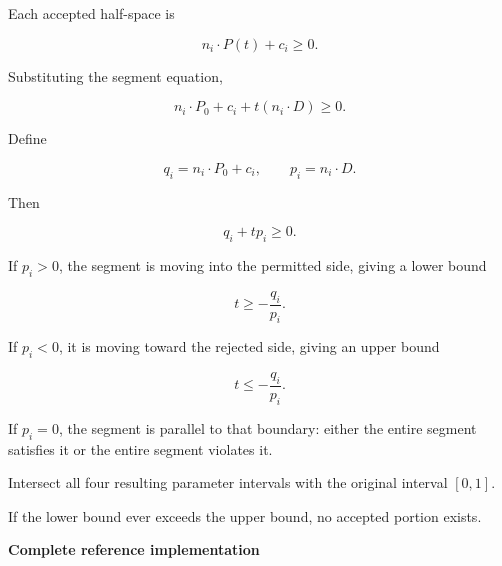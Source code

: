 Each accepted half-space is

\[
n_i\cdot P(t)+c_i\ge0.
\]

Substituting the segment equation,

\[
n_i\cdot P_0+c_i+t(n_i\cdot D)\ge0.
\]

Define

\[
q_i=n_i\cdot P_0+c_i,\qquad p_i=n_i\cdot D.
\]

Then

\[
q_i+t p_i\ge0.
\]

If \(p_i>0\), the segment is moving into the permitted side, giving a lower bound

\[
t\ge-\frac{q_i}{p_i}.
\]

If \(p_i<0\), it is moving toward the rejected side, giving an upper bound

\[
t\le-\frac{q_i}{p_i}.
\]

If \(p_i=0\), the segment is parallel to that boundary: either the entire segment satisfies it or the entire segment violates it.

Intersect all four resulting parameter intervals with the original interval \([0,1]\).

If the lower bound ever exceeds the upper bound, no accepted portion exists.

\textbf{Complete reference implementation}

